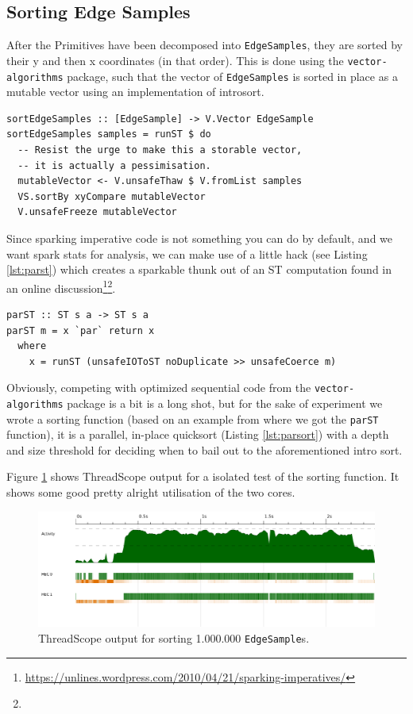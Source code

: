 \documentclass[12pt, a4paper]{article}
\begin{document}
\subsection{Sorting Edge Samples}

After the Primitives have been decomposed into \texttt{EdgeSamples}, they are sorted by their y and then x coordinates (in that order).
This is done using the \texttt{vector-algorithms} package, such that the vector of \texttt{EdgeSamples} is sorted in place as a mutable vector
 using an implementation of introsort.
\begin{lstlisting}[caption={Sorting the edge samples.}]
sortEdgeSamples :: [EdgeSample] -> V.Vector EdgeSample
sortEdgeSamples samples = runST $ do
  -- Resist the urge to make this a storable vector,
  -- it is actually a pessimisation.
  mutableVector <- V.unsafeThaw $ V.fromList samples
  VS.sortBy xyCompare mutableVector
  V.unsafeFreeze mutableVector
\end{lstlisting}

Since sparking imperative code is not something you can do by default, and we want spark stats for
analysis, we can make use of a little hack (see Listing \ref{lst:parst}) which creates a sparkable
 thunk out of an ST computation found in an online discussion\footnote{\label{note1}\url{https://unlines.wordpress.com/2010/04/21/sparking-imperatives/}}\footnote{}.
\begin{lstlisting}[label={lst:parst}, caption={\texttt{parST}}]
parST :: ST s a -> ST s a
parST m = x `par` return x
  where
    x = runST (unsafeIOToST noDuplicate >> unsafeCoerce m)
\end{lstlisting}
Obviously, competing with optimized sequential code from the \texttt{vector-algorithms} package is a
 bit is a long shot, but for the sake of experiment we wrote a sorting function (based on an example from where we got the \texttt{parST} function),
 it is a parallel, in-place quicksort (Listing \ref{lst:parsort}) with a depth and size threshold for deciding when to bail out to the aforementioned intro sort.

 Figure \ref{fig:sorting-thread} shows ThreadScope output for a isolated test of the sorting function.
 It shows some good pretty alright utilisation of the two cores.

 \begin{figure}[h!]
  \centering
  \includegraphics[width=0.85\linewidth]{../threadscope/sorting/sorting-final}
  \caption{ThreadScope output for sorting 1.000.000 \texttt{EdgeSample}s.}
  \label{fig:sorting-thread}
\end{figure}
\end{document}
